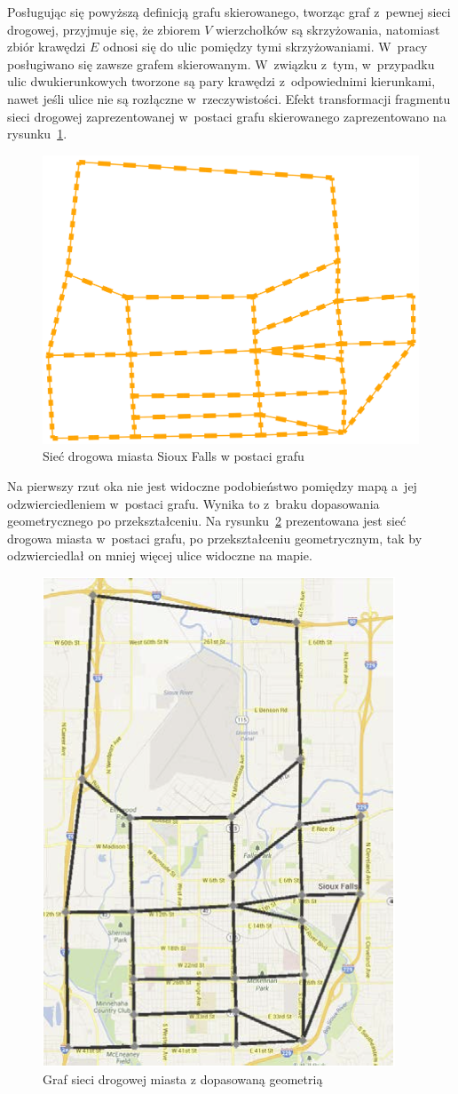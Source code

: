 \documentclass[twoside,12pt]{report}
\begin{document}
Posługując się powyższą definicją grafu skierowanego, tworząc graf z~pewnej sieci drogowej, przyjmuje się, że zbiorem $V$ wierzchołków są skrzyżowania, natomiast zbiór krawędzi $E$ odnosi się do ulic pomiędzy tymi skrzyżowaniami. W~pracy posługiwano się zawsze grafem skierowanym. W~związku z~tym, w~przypadku ulic dwukierunkowych tworzone są pary krawędzi z~odpowiednimi kierunkami, nawet jeśli ulice nie są rozłączne w~rzeczywistości. Efekt transformacji fragmentu sieci drogowej zaprezentowanej w~postaci grafu skierowanego zaprezentowano na rysunku~\ref{fig:siouxfalls_ex_graf}.

\begin{figure}[htbp]
	\centering
	\includegraphics[width=0.5\linewidth]{img/graf}
	\caption{Sieć drogowa miasta Sioux Falls w postaci grafu}
	\label{fig:siouxfalls_ex_graf}
\end{figure}

Na pierwszy rzut oka nie jest widoczne podobieństwo pomiędzy mapą a~jej odzwierciedleniem w~postaci grafu. Wynika to z~braku dopasowania geometrycznego po przekształceniu. Na rysunku~\ref{fig:siouxfalls_ex_graf_geometry} prezentowana jest sieć drogowa miasta w~postaci grafu, po przekształceniu geometrycznym, tak by odzwierciedlał on mniej więcej ulice widoczne na mapie.

\begin{figure}[htbp]
	\centering
	\includegraphics[width=0.42\linewidth]{img/dopasowanie}
	\caption{Graf sieci drogowej miasta z dopasowaną geometrią}
	\label{fig:siouxfalls_ex_graf_geometry}
\end{figure}
\end{document}
